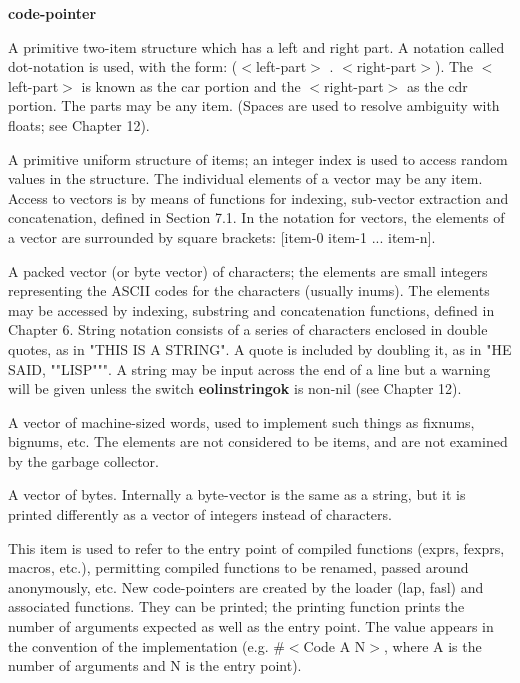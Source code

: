 \begin{Ventry}{\bf code-pointer}
\item [{\bf pair}]     A  primitive two-item structure  which has a  left
			and  right part.  A notation  called  dot-notation
			is used, with the form:
			($<$left-part$>$   .  $<$right-part$>$). 
			The $<$left-part$>$ is  known  as the car  portion 
			and  the  $<$right-part$>$  as  the  cdr portion. 
			The parts may be any item.  (Spaces  are used  to
			resolve  ambiguity  with  floats;  see Chapter 12).

\item [{\bf vector }]  A primitive uniform structure of items; an integer
			index is used  to  access  random  values  in  the
			structure.    The  individual elements of a vector
			may be any item.  Access to vectors is by means of
			functions for indexing, sub-vector extraction  and
			concatenation,  defined  in  Section  7.1.  In the
			notation for vectors, the elements of a vector are
			surrounded by square brackets:
			[item-0 item-1 ... item-n]. 

\item [{\bf string}]   A  packed  vector  (or byte vector) of characters;
			the elements are small integers  representing the
			ASCII  codes  for  the characters (usually inums).
			The  elements  may  be   accessed   by   indexing,
			substring  and concatenation functions, defined in
			Chapter 6.  String notation consists of  a  series
			of  characters  enclosed  in  double quotes, as in
			"THIS IS A  STRING".    A  quote  is  included  by
			doubling  it, as in "HE SAID, ""LISP""".  A string
			may be input across  the  end  of  a  line  but  a
			warning   will   be   given   unless   the  switch
			{\bf  eolinstringok}
			 is non-nil (see Chapter 12).

\item [{\bf w-vector}] A vector of machine-sized words, used to implement
			such  things  as  fixnums,  bignums,  etc. The
			elements  are  not considered to be items, and are
			not examined by the garbage collector.

\item [{\bf byte-vector}]   A vector of bytes.  Internally  a  byte-vector  is
              the   same   as   a  string,  but  it  is  printed
              differently as a vector  of  integers  instead  of
              characters.

\item [{\bf code-pointer}] This  item  is used to refer to the entry point of
              compiled functions (exprs, fexprs, macros,  etc.),
              permitting   compiled  functions  to  be  renamed,
              passed around anonymously, etc.  New code-pointers
              are  created  by  the  loader  (lap,   fasl)   and
              associated  functions.   They can be printed;  the
              printing function prints the number  of  arguments
              expected  as  well  as the entry point.  The value
              appears in the convention  of  the  implementation
              (e.g.  \#$<$Code  A  N$>$,  where  A  is  the number of
              arguments and N is the entry point).
\end{Ventry}

